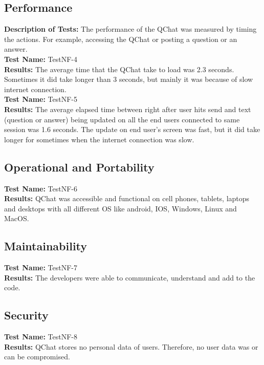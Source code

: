 \documentclass[12pt, titlepage]{article}
\begin{document}
		
\subsection{Performance}
\textbf{Description of Tests:} The performance of the QChat was measured by timing the actions. For example, accessing the QChat or posting a question or an answer.\\

\noindent\textbf{Test Name:} TestNF-4 \\
\textbf{Results:} The average time that the QChat take to load was 2.3 seconds. Sometimes it did take longer than 3 seconds, but mainly it was because of slow internet connection. \\

\noindent\textbf{Test Name:} TestNF-5 \\
\textbf{Results:} The average elapsed time between right after user hits send and text (question or answer) being updated on all the end users connected to same session was 1.6 seconds. The update on end user’s screen was fast, but it did take longer for sometimes when the internet connection was slow.  \\


\subsection{Operational and Portability}
\textbf{Test Name:} TestNF-6 \\
\textbf{Results:} QChat was accessible and functional on cell phones, tablets, laptops and desktops with all different OS like android, IOS, Windows, Linux and MacOS.  \\

\subsection{Maintainability}
\textbf{Test Name:} TestNF-7 \\
\textbf{Results:} The developers were able to communicate, understand and add to the code. \\

\subsection{Security}
\textbf{Test Name:} TestNF-8 \\
\textbf{Results:} QChat stores no personal data of users. Therefore, no user data was or can be compromised.  \\
\end{document}
